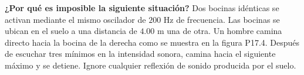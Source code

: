 \item \textbf{¿Por qué es imposible la siguiente situación?}
Dos bocinas idénticas se activan mediante el mismo oscilador de $200\text{ Hz}$ de frecuencia. Las bocinas se ubican en el suelo a una distancia de $4.00\text{ m}$ una de otra. Un hombre camina directo hacia la bocina de la derecha como se muestra en la figura P17.4. Después de escuchar tres mínimos en la intensidad sonora, camina hacia el siguiente máximo y se detiene. Ignore cualquier reflexión de sonido producida por el suelo.